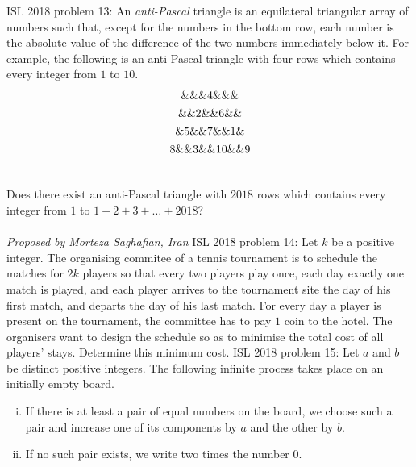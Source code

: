 ISL 2018 problem 13:  An \textit{anti-Pascal} triangle is an equilateral triangular array of numbers such that, except for the numbers in the bottom row, each number is the absolute value of the difference of the two numbers immediately below it. For example, the following is an anti-Pascal triangle with four rows which contains every integer from $1$ to $10$.
\[
\begin{array}{
c@{\hspace{4pt}}c@{\hspace{4pt}}
c@{\hspace{4pt}}c@{\hspace{2pt}}c@{\hspace{2pt}}c@{\hspace{4pt}}c
} \vspace{4pt}
 \& \& \& 4 \& \& \&  \\\vspace{4pt}
 \& \& 2 \& \& 6 \& \&  \\\vspace{4pt}
 \& 5 \& \& 7 \& \& 1 \& \\\vspace{4pt}
 8 \& \& 3 \& \& 10 \& \& 9 \\\vspace{4pt}
\end{array}
\]
Does there exist an anti-Pascal triangle with $2018$ rows which contains every integer from $1$ to $1 + 2 + 3 + \dots + 2018$? \\\\
\textit{Proposed by Morteza Saghafian, Iran} 
ISL 2018 problem 14:  Let $k$ be a positive integer. The organising commitee of a tennis tournament is to schedule the matches for $2k$ players so that every two players play once, each day exactly one match is played, and each player arrives to the tournament site the day of his first match, and departs the day of his last match. For every day a player is present on the tournament, the committee has to pay $1$ coin to the hotel. The organisers want to design the schedule so as to minimise the total cost of all players' stays. Determine this minimum cost. 
ISL 2018 problem 15:  Let $a$ and $b$ be distinct positive integers. The following infinite process takes place on an initially empty board.
\begin{enumerate}[i.]
  \item If there is at least a pair of equal numbers on the board, we choose such a pair and increase one of its components by $a$ and the other by $b$.
  \item If no such pair exists, we write two times the number $0$.
\end{enumerate}
